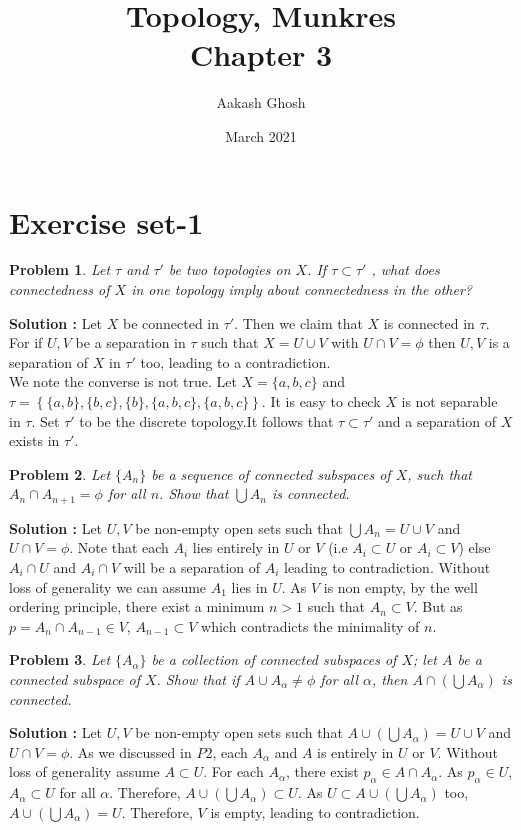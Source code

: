 \documentclass{article}
\title{Topology, Munkres\\ Chapter 3}
\author{Aakash Ghosh}
\date{March 2021}
\newtheorem{problem}{Problem}
\numberwithin{problem}{section}
\begin{document}
\maketitle
\section{Exercise set-1}
\begin{tcolorbox}
\begin{problem}
Let $\tau$ and $\tau'$ be two topologies on $X$. If $\tau \subset \tau'$ , what does connectedness
of $X$ in one topology imply about connectedness in the other?
\end{problem}
\end{tcolorbox}
\textbf{Solution :}
Let $X$ be connected in $\tau'$. Then we claim that $X$ is connected in $\tau$. For if $U,V$ be a separation in $\tau$ such that $X=U\cup V$ with $U\cap V=\phi$ then 
$U,V$ is a separation of $X$ in $\tau'$ too, leading to a contradiction. \\
We note the converse is not true. Let $X=\{a,b,c\}$ and $\tau=\left\{\{a,b\},\{b,c\},\{b\},\{a,b,c\},\{a,b,c\}\right\}$. It is easy to check $X$ is not separable in $\tau$. Set $\tau'$ to be the discrete topology.It follows that $\tau\subset \tau'$ and a separation of $X$ exists in $\tau'$.


\begin{tcolorbox}
\begin{problem}
Let $\{A_n\}$ be a sequence of connected subspaces of $X$, such that $A_n \cap A_{n+1}=\phi$
for all $n$. Show that $\bigcup A_n$ is connected.
\end{problem}
\end{tcolorbox}
\textbf{Solution :}
Let $U,V$ be non-empty open sets such that $\bigcup A_n=U\cup V$ and $U\cap V=\phi$.
Note that each $A_i$ lies entirely in $U$ or $V$ (i.e $A
_i\subset U$ or $A_i\subset V$) else $A_i\cap U$ and $A_i\cap V$ will be a separation of $A_i$ leading to contradiction. Without loss of generality we can assume $A_1$ lies in $U$. As $V$ is non empty, by the well ordering principle, there exist a minimum $n>1$ such that $A_n\subset V$. But as $p=A_{n}\cap A_{n-1}\in V$, $A_{n-1}\subset V$ which contradicts the minimality of $n$.


\begin{tcolorbox}
\begin{problem}
Let $\{A_\alpha\}$ be a collection of connected subspaces of $X$; let $A$ be a connected
subspace of $X$. Show that if $A\cup  A_\alpha \ne \phi$ for all 
$\alpha$, then $A\cap(
\bigcup A_\alpha)$ is connected.
\end{problem}
\end{tcolorbox}
\textbf{Solution :}
Let $U,V$ be non-empty open sets such that $A\cup\left(\bigcup A_\alpha\right)=U\cup V$ and $U\cap V=\phi$. As we discussed in $P2$, each $A_\alpha$ and $A$ is entirely in $U$ or $V$. Without loss of generality assume $A\subset U$. For each $A_\alpha$, there exist $p_\alpha\in A\cap A_\alpha$. As $p_\alpha\in U$, $A_\alpha\subset U$ for all $\alpha$. Therefore, $A\cup\left(\bigcup A_\alpha\right)\subset U$. As $U\subset A\cup\left(\bigcup A_\alpha\right)$ too, $A\cup\left(\bigcup A_\alpha\right)=U$. Therefore, $V$ is empty, leading to contradiction. 
\end{document}
